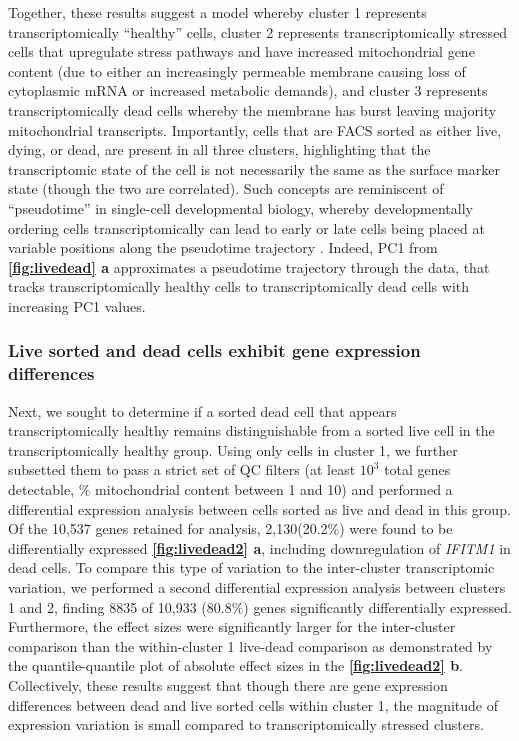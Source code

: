 Together, these results suggest a model whereby cluster 1 represents transcriptomically ``healthy'' cells, cluster 2 represents transcriptomically stressed cells that upregulate stress pathways  and have increased mitochondrial gene content (due to either an increasingly permeable membrane causing loss of cytoplasmic mRNA or increased metabolic demands), and cluster 3 represents transcriptomically dead cells whereby the membrane has burst leaving majority mitochondrial transcripts. Importantly, cells that are FACS sorted as either live, dying, or dead, are present in all three clusters, highlighting that the transcriptomic state of the cell is not necessarily the same as the surface marker state (though the two are correlated). Such concepts are reminiscent of ``pseudotime'' in single-cell developmental biology, whereby developmentally ordering cells transcriptomically can lead to early or late cells being placed at variable positions along the pseudotime trajectory \cite{campbell2018descriptive,campbell2018uncovering}. Indeed, PC1 from \textbf{\autoref{fig:livedead} a} approximates a pseudotime trajectory through the data, that tracks transcriptomically healthy cells to transcriptomically dead cells with increasing PC1 values.

\subsubsection{Live sorted and dead cells exhibit gene expression differences}
Next, we sought to determine if a sorted dead cell that appears transcriptomically healthy remains distinguishable from a sorted live cell in the transcriptomically healthy group. Using only cells in cluster 1, we further subsetted them to pass a strict set of QC filters (at least $10^3$ total genes detectable, \% mitochondrial content between 1 and 10) and performed a differential expression analysis between cells sorted as live and dead in this group. Of the 10,537 genes retained for analysis, 2,130(20.2\%) were found to be differentially expressed \textbf{\autoref{fig:livedead2} a}, including downregulation of \textit{IFITM1} in dead cells. To compare this type of variation to the inter-cluster transcriptomic variation, we performed a second differential expression analysis between clusters 1 and 2, finding 8835 of 10,933 (80.8\%) genes significantly differentially expressed. Furthermore, the effect sizes were significantly larger for the inter-cluster comparison than the within-cluster 1 live-dead comparison as demonstrated by the quantile-quantile plot of absolute effect sizes in the \textbf{\autoref{fig:livedead2} b}. Collectively, these results suggest that though there are gene expression differences between dead and live sorted cells within cluster 1, the magnitude of expression variation is small compared to transcriptomically stressed clusters.
 
